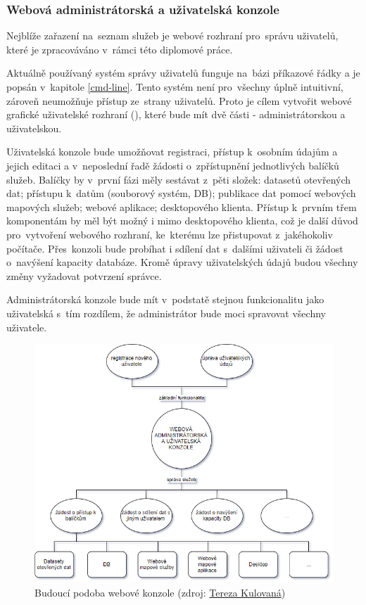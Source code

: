 \subsubsection{Webová administrátorská a uživatelská konzole}

Nejblíže zařazení na~seznam služeb je webové rozhraní pro~správu
uživatelů, které je zpracováváno v~rámci této diplomové
práce. 

Aktuálně používaný systém správy uživatelů funguje na~bázi příkazové
řádky a je popsán v~kapitole \ref{cmd-line}. Tento systém není pro~všechny 
úplně intuitivní, zároveň neumožňuje přístup ze~strany
uživatelů. Proto je cílem vytvořit webové grafické uživatelské
rozhraní (), které bude mít dvě části - administrátorskou a
uživatelskou.

Uživatelská konzole bude umožňovat registraci, přístup k~osobním
údajům a jejich editaci a v~neposlední řadě žádosti o~zpřístupnění
jednotlivých balíčků služeb. Balíčky by v~první fázi měly sestávat z~pěti 
složek: datasetů otevřených dat; přístupu k~datům (souborový
systém, DB); publikace dat pomocí webových mapových služeb; webové
aplikace; desktopového klienta. Přístup k~prvním třem komponentám by
měl být možný i mimo desktopového klienta, což je další důvod pro~vytvoření 
webového rozhraní, ke~kterému lze přistupovat z~jakéhokoliv
počítače. Přes~konzoli bude probíhat i sdílení dat s~dalšími uživateli
či žádost o~navýšení kapacity databáze. Kromě úpravy uživatelských
údajů budou všechny změny vyžadovat potvrzení správce.

Administrátorská konzole bude mít v~podstatě stejnou funkcionalitu
jako uživatelská s~tím rozdílem, že administrátor bude moci spravovat
všechny uživatele.

\begin{figure}[H] \centering
    \includegraphics[width=400pt]{./pictures/console_services_02.png}
    \caption[Budoucí podoba webové konzole]{Budoucí podoba webové konzole (zdroj:
	\href{}{Tereza Kulovaná})}
    \label{fig:konzole-sluzby}
\end{figure}

